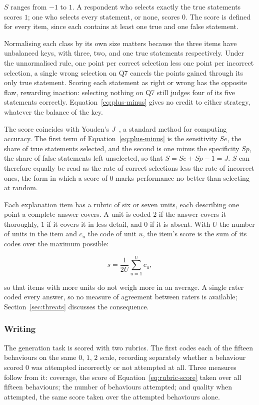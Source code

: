 $S$ ranges from $-1$ to $1$. A respondent who selects exactly the true statements scores $1$; one who selects every statement, or none, scores $0$. The score is defined for every item, since each contains at least one true and one false statement.
 
Normalising each class by its own size matters because the three items have unbalanced keys, with three, two, and one true statements respectively. Under the unnormalised rule, one point per correct selection less one point per incorrect selection, a single wrong selection on Q7 cancels the points gained through its only true statement. Scoring each statement as right or wrong has the opposite flaw, rewarding inaction: selecting nothing on Q7 still judges four of its five statements correctly. Equation~\ref{eq:plus-minus} gives no credit to either strategy, whatever the balance of the key.
 
The score coincides with Youden's $J$~\cite{Youden1950}, a standard method for computing accuracy. The first term of Equation~\ref{eq:plus-minus} is the sensitivity $Se$, the share of true statements selected, and the second is one minus the specificity $Sp$, the share of false statements left unselected, so that $S = Se + Sp - 1 = J$. $S$ can therefore equally be read as the rate of correct selections less the rate of incorrect ones, the form in which a score of $0$ marks performance no better than selecting at random.
 
Each explanation item has a rubric of six or seven units, each describing one point a complete answer covers. A unit is coded $2$ if the answer covers it thoroughly, $1$ if it covers it in less detail, and $0$ if it is absent. With $U$ the number of units in the item and $c_u$ the code of unit $u$, the item's score is the sum of its codes over the maximum possible:

\begin{equation}
s = \frac{1}{2U} \sum_{u=1}^{U} c_u,
\label{eq:rubric-score}
\end{equation}

so that items with more units do not weigh more in an average. A single rater coded every answer, so no measure of agreement between raters is available; Section~\ref{sec:threats} discusses the consequence.
 
\subsubsection{Writing}
 
The generation task is scored with two rubrics. The first codes each of the fifteen behaviours on the same $0$, $1$, $2$ scale, recording separately whether a behaviour scored $0$ was attempted incorrectly or not attempted at all. Three measures follow from it: coverage, the score of Equation~\ref{eq:rubric-score} taken over all fifteen behaviours; the number of behaviours attempted; and quality when attempted, the same score taken over the attempted behaviours alone.
 
